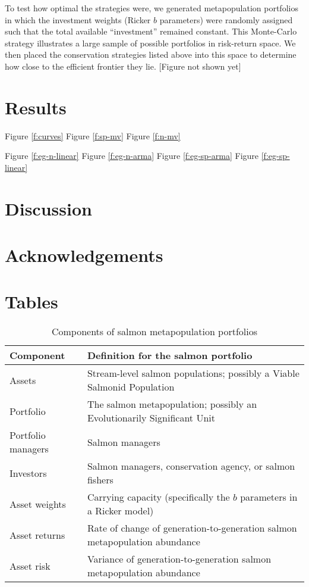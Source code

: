 To test how optimal the strategies were, we generated metapopulation
portfolios in which the investment weights (Ricker $b$ parameters) were
randomly assigned such that the total available ``investment'' remained
constant. This Monte-Carlo strategy illustrates a large sample of
possible portfolios in risk-return space. We then placed the
conservation strategies listed above into this space to determine how
close to the efficient frontier they lie. {[}Figure not shown yet{]}

\section{Results}

Figure \ref{f:curves} Figure \ref{f:sp-mv} Figure \ref{f:n-mv}

Figure \ref{f:eg-n-linear} Figure \ref{f:eg-n-arma} Figure
\ref{f:eg-sp-arma} Figure \ref{f:eg-sp-linear}

\section{Discussion}

\section{Acknowledgements}





\clearpage

\section{Tables}

\begin{table}[h!]
\centering
\small
\caption{Components of salmon metapopulation portfolios}
\begin{tabular}{p{3.6cm}p{7.5cm}}
\toprule
Component          & Definition for the salmon portfolio\\
\midrule
Assets             & Stream-level salmon populations; possibly a Viable Salmonid Population\\
Portfolio          & The salmon metapopulation; possibly an Evolutionarily Significant Unit\\
Portfolio managers & Salmon managers\\
Investors          & Salmon managers, conservation agency, or salmon fishers\\
Asset weights      & Carrying capacity (specifically the $b$ parameters in a Ricker model)\\
Asset returns      & Rate of change of generation-to-generation salmon metapopulation abundance\\
Asset risk         & Variance of generation-to-generation salmon metapopulation abundance\\
\bottomrule
\end{tabular}
\label{t:port}
\end{table}

